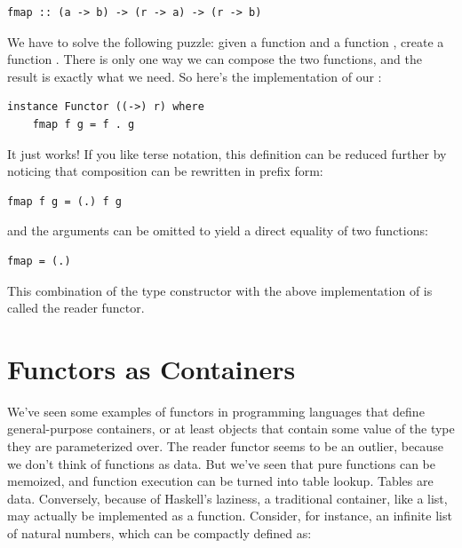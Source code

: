 \begin{Verbatim}
fmap :: (a -> b) -> (r -> a) -> (r -> b)
\end{Verbatim}
We have to solve the following puzzle: given a function
 and a function
, create a function
. There is only one way we can compose the two
functions, and the result is exactly what we need. So here's the
implementation of our :

\begin{Verbatim}
instance Functor ((->) r) where
    fmap f g = f . g
\end{Verbatim}
It just works! If you like terse notation, this definition can be
reduced further by noticing that composition can be rewritten in prefix
form:

\begin{Verbatim}
fmap f g = (.) f g
\end{Verbatim}
and the arguments can be omitted to yield a direct equality of two
functions:

\begin{Verbatim}
fmap = (.)
\end{Verbatim}
This combination of the type constructor 
with the above implementation of  is called the reader
functor.

\section{Functors as Containers}

We've seen some examples of functors in programming languages that
define general-purpose containers, or at least objects that contain some
value of the type they are parameterized over. The reader functor seems
to be an outlier, because we don't think of functions as data. But we've
seen that pure functions can be memoized, and function execution can be
turned into table lookup. Tables are data. Conversely, because of
Haskell's laziness, a traditional container, like a list, may actually
be implemented as a function. Consider, for instance, an infinite list
of natural numbers, which can be compactly defined as:

